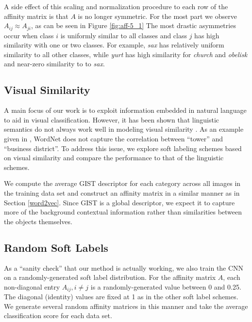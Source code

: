 A side effect of this scaling and normalization procedure to each row of the
affinity matrix is that $A$ is no longer symmetric. For the most part we observe
$A_{ij} \approx A_{ji}$, as can be seen in Figure \ref{fig:aff-5_1} The most
drastic asymmetries occur when class $i$ is uniformly similar to all classes and
class $j$ has high similarity with one or two classes. For example, \emph{sax}
has relatively uniform similarity to all other classes, while \emph{yurt} has
high similarity for \emph{church} and \emph{obelisk} and near-zero similarity to
to \emph{sax}.

\subsection{Visual Similarity}

A main focus of our work is to exploit information embedded in natural language
to aid in visual classification.  However, it has been shown that linguistic
semantics do not always work well in modeling visual similarity
\cite{li2010building}. As an example given in \cite{li2010building}, WordNet
does not capture the correlation between ``tower'' and ``business district''. To
address this issue, we explore soft labeling schemes based on visual similarity
and compare the performance to that of the linguistic schemes.


We compute the average GIST descriptor \cite{oliva2001modeling} for each
category across all images in the training data set and construct an affinity
matrix in a similar manner as in Section \ref{word2vec}. Since GIST is a global
descriptor, we expect it to capture more of the background contextual
information rather than similarities between the objects themselves.


\subsection{Random Soft Labels}

As a ``sanity check'' that our method is actually working, we also train the
CNN on a randomly-generated soft label distribution. For the affinity matrix
$A$, each non-diagonal entry $A_{ij}, i \neq j$ is a randomly-generated value
between 0 and 0.25. The diagonal (identity) values are fixed at 1 as in the
other soft label schemes. We generate several random affinity matrices in this
manner and take the average classification score for each data set.

